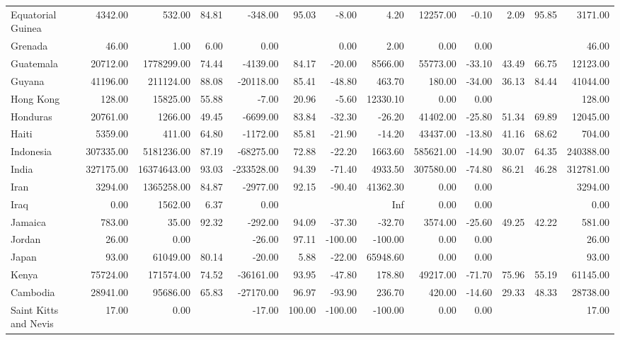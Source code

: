 \begin{table}[ht]
\begin{tabular}{lrrrrrrrrrrrr}
  Equatorial Guinea & 4342.00 & 532.00 & 84.81 & -348.00 & 95.03 & -8.00 & 4.20 & 12257.00 & -0.10 & 2.09 & 95.85 & 3171.00 \\ 
  Grenada & 46.00 & 1.00 & 6.00 & 0.00 &  & 0.00 & 2.00 & 0.00 & 0.00 &  &  & 46.00 \\ 
  Guatemala & 20712.00 & 1778299.00 & 74.44 & -4139.00 & 84.17 & -20.00 & 8566.00 & 55773.00 & -33.10 & 43.49 & 66.75 & 12123.00 \\ 
  Guyana & 41196.00 & 211124.00 & 88.08 & -20118.00 & 85.41 & -48.80 & 463.70 & 180.00 & -34.00 & 36.13 & 84.44 & 41044.00 \\ 
  Hong Kong & 128.00 & 15825.00 & 55.88 & -7.00 & 20.96 & -5.60 & 12330.10 & 0.00 & 0.00 &  &  & 128.00 \\ 
  Honduras & 20761.00 & 1266.00 & 49.45 & -6699.00 & 83.84 & -32.30 & -26.20 & 41402.00 & -25.80 & 51.34 & 69.89 & 12045.00 \\ 
  Haiti & 5359.00 & 411.00 & 64.80 & -1172.00 & 85.81 & -21.90 & -14.20 & 43437.00 & -13.80 & 41.16 & 68.62 & 704.00 \\ 
  Indonesia & 307335.00 & 5181236.00 & 87.19 & -68275.00 & 72.88 & -22.20 & 1663.60 & 585621.00 & -14.90 & 30.07 & 64.35 & 240388.00 \\ 
  India & 327175.00 & 16374643.00 & 93.03 & -233528.00 & 94.39 & -71.40 & 4933.50 & 307580.00 & -74.80 & 86.21 & 46.28 & 312781.00 \\ 
  Iran & 3294.00 & 1365258.00 & 84.87 & -2977.00 & 92.15 & -90.40 & 41362.30 & 0.00 & 0.00 &  &  & 3294.00 \\ 
  Iraq & 0.00 & 1562.00 & 6.37 & 0.00 &  &  & Inf & 0.00 & 0.00 &  &  & 0.00 \\ 
  Jamaica & 783.00 & 35.00 & 92.32 & -292.00 & 94.09 & -37.30 & -32.70 & 3574.00 & -25.60 & 49.25 & 42.22 & 581.00 \\ 
  Jordan & 26.00 & 0.00 &  & -26.00 & 97.11 & -100.00 & -100.00 & 0.00 & 0.00 &  &  & 26.00 \\ 
  Japan & 93.00 & 61049.00 & 80.14 & -20.00 & 5.88 & -22.00 & 65948.60 & 0.00 & 0.00 &  &  & 93.00 \\ 
  Kenya & 75724.00 & 171574.00 & 74.52 & -36161.00 & 93.95 & -47.80 & 178.80 & 49217.00 & -71.70 & 75.96 & 55.19 & 61145.00 \\ 
  Cambodia & 28941.00 & 95686.00 & 65.83 & -27170.00 & 96.97 & -93.90 & 236.70 & 420.00 & -14.60 & 29.33 & 48.33 & 28738.00 \\ 
  Saint Kitts and Nevis & 17.00 & 0.00 &  & -17.00 & 100.00 & -100.00 & -100.00 & 0.00 & 0.00 &  &  & 17.00 \\ 

\end{tabular}
\end{table}
